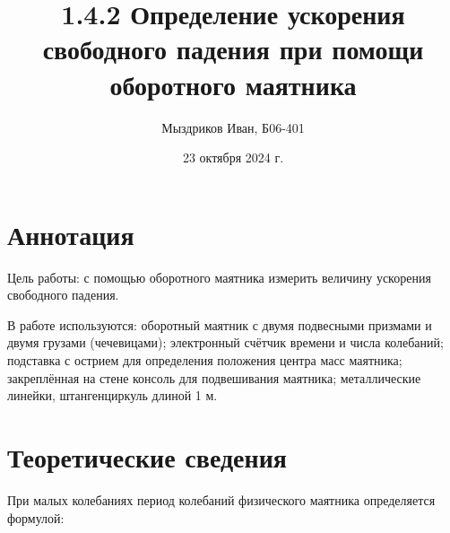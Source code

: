 \documentclass[a4paper, 10pt]{article}%
\title{1.4.2 Определение ускорения свободного падения при помощи оборотного маятника}
\author{Мыздриков Иван, Б06-401}
\date{23 октября 2024 г.}
\begin{document}
\maketitle

\section{Аннотация}
Цель работы: с помощью оборотного маятника измерить величину ускорения свободного падения. 

В работе используются: оборотный маятник с двумя подвесными призмами и двумя грузами (чечевицами); электронный счётчик времени и числа колебаний; подставка с острием для определения положения центра масс маятника; закреплённая на стене консоль для подвешивания маятника; металлические линейки, штангенциркуль длиной 1 м. 

\section{Теоретические сведения}
При малых колебаниях период колебаний физического маятника определяется формулой:
\end{document}
